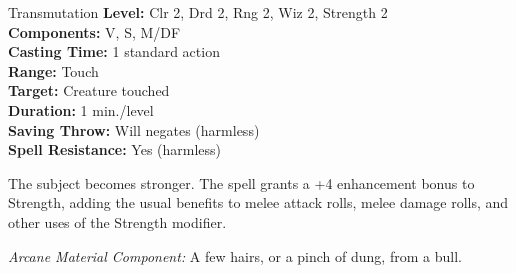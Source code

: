 {Transmutation}
{
	\textbf{Level:}
	Clr 2, Drd 2, Rng 2, Wiz 2, Strength 2\\
	\textbf{Components:}
	V, S, M/DF\\
	\textbf{Casting Time:}
	1 standard action\\
	\textbf{Range:}
	Touch\\
	\textbf{Target:}
	Creature touched\\
	\textbf{Duration:}
	1 min./level\\
	\textbf{Saving Throw:}
	Will negates (harmless)\\
	\textbf{Spell Resistance:}
	Yes (harmless)\\
}
{
	The subject becomes stronger. The spell grants a +4 enhancement bonus to Strength, adding the usual benefits to melee attack rolls, melee damage rolls, and other uses of the Strength modifier.

	\textit{Arcane Material Component:}
	A few hairs, or a pinch of dung, from a bull.

}
